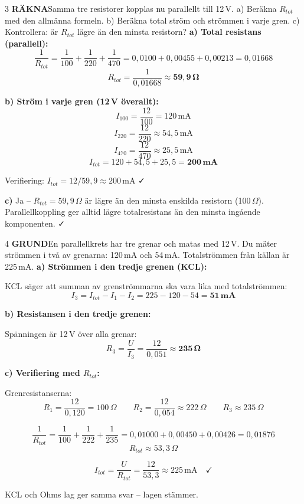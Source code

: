 \documentclass[a4paper,11pt,twoside]{book}
\newcommand{\qgrund}{\colorbox{greenpale}{\textcolor{greendark}{\headingfont\bfseries\tiny GRUND}}}
\newcommand{\qrakna}{\colorbox{bluepale}{\textcolor{bluedark}{\headingfont\bfseries\tiny RÄKNA}}}
\begin{document}
\begin{facitblock}{3}
\qrakna\quad Samma tre resistorer kopplas nu parallellt 
till 12\,V.
a) Beräkna $R_{tot}$ med den allmänna formeln.
b) Beräkna total ström och strömmen i varje gren.
c) Kontrollera: är $R_{tot}$ lägre än den minsta resistorn?
\tcblower
\textbf{a) Total resistans (parallell):}
\[ \frac{1}{R_{tot}} = \frac{1}{100} + \frac{1}{220} + \frac{1}{470} 
   = 0{,}0100 + 0{,}00455 + 0{,}00213 = 0{,}01668 \]
\[ R_{tot} = \frac{1}{0{,}01668} \approx \mathbf{59{,}9\,\Omega} \]

\textbf{b) Ström i varje gren (12\,V överallt):}
\[ I_{100} = \frac{12}{100} = 120\,\text{mA} \]
\[ I_{220} = \frac{12}{220} \approx 54{,}5\,\text{mA} \]
\[ I_{470} = \frac{12}{470} \approx 25{,}5\,\text{mA} \]
\[ I_{tot} = 120 + 54{,}5 + 25{,}5 = \mathbf{200\,\text{mA}} \]

Verifiering: $I_{tot} = 12 / 59{,}9 \approx 200\,\text{mA}$ ✓

\textbf{c)} Ja -- $R_{tot} = 59{,}9\,\Omega$ är lägre än 
den minsta enskilda resistorn (100\,$\Omega$). 
Parallellkoppling ger alltid lägre totalresistans än 
den minsta ingående komponenten. ✓
\end{facitblock}

\begin{facitblock}{4}
\qgrund\quad En parallellkrets har tre grenar och matas 
med 12\,V. Du mäter strömmen i två av grenarna: 
120\,mA och 54\,mA. Totalströmmen från källan är 
225\,mA.
\tcblower
\textbf{a) Strömmen i den tredje grenen (KCL):}

KCL säger att summan av grenströmmarna ska vara lika 
med totalströmmen:
\[ I_3 = I_{tot} - I_1 - I_2 = 225 - 120 - 54 = \mathbf{51\,\text{mA}} \]

\textbf{b) Resistansen i den tredje grenen:}

Spänningen är 12\,V över alla grenar:
\[ R_3 = \frac{U}{I_3} = \frac{12}{0{,}051} \approx \mathbf{235\,\Omega} \]

\textbf{c) Verifiering med $R_{tot}$:}

Grenresistanserna:
\[ R_1 = \frac{12}{0{,}120} = 100\,\Omega \qquad R_2 = \frac{12}{0{,}054} \approx 222\,\Omega \qquad R_3 \approx 235\,\Omega \]

\[ \frac{1}{R_{tot}} = \frac{1}{100} + \frac{1}{222} + \frac{1}{235} = 0{,}01000 + 0{,}00450 + 0{,}00426 = 0{,}01876 \]
\[ R_{tot} \approx 53{,}3\,\Omega \]

\[ I_{tot} = \frac{U}{R_{tot}} = \frac{12}{53{,}3} \approx 225\,\text{mA} \quad \checkmark \]

KCL och Ohms lag ger samma svar -- lagen stämmer.
\end{facitblock}
\end{document}
